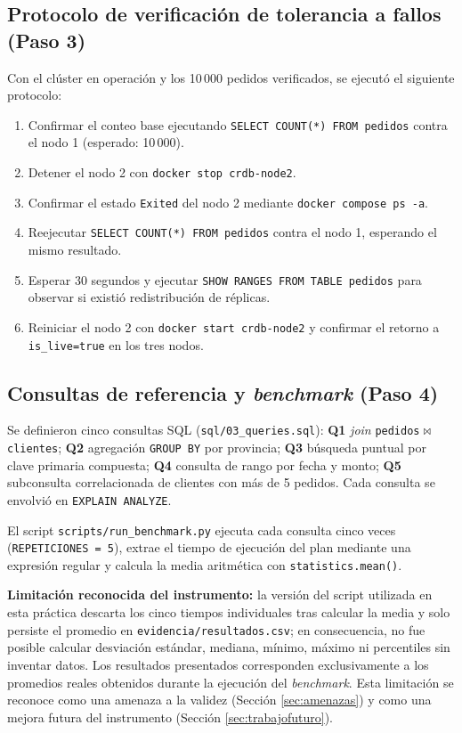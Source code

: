 \documentclass[10pt,letterpaper]{article}
\begin{document}
\subsection{Protocolo de verificación de tolerancia a fallos (Paso 3)}
Con el clúster en operación y los 10\,000 pedidos verificados, se ejecutó el siguiente protocolo:
\begin{enumerate}[leftmargin=*]
\item Confirmar el conteo base ejecutando \texttt{SELECT COUNT(*) FROM pedidos} contra el nodo 1 (esperado: 10\,000).
\item Detener el nodo 2 con \texttt{docker stop crdb-node2}.
\item Confirmar el estado \texttt{Exited} del nodo 2 mediante \texttt{docker compose ps -a}.
\item Reejecutar \texttt{SELECT COUNT(*) FROM pedidos} contra el nodo 1, esperando el mismo resultado.
\item Esperar 30 segundos y ejecutar \texttt{SHOW RANGES FROM TABLE pedidos} para observar si existió redistribución de réplicas.
\item Reiniciar el nodo 2 con \texttt{docker start crdb-node2} y confirmar el retorno a \texttt{is\_live=true} en los tres nodos.
\end{enumerate}

\subsection{Consultas de referencia y \textit{benchmark} (Paso 4)}
Se definieron cinco consultas SQL (\texttt{sql/03\_queries.sql}): \textbf{Q1} \textit{join} \texttt{pedidos}$\Join$\texttt{clientes}; \textbf{Q2} agregación \texttt{GROUP BY} por provincia; \textbf{Q3} búsqueda puntual por clave primaria compuesta; \textbf{Q4} consulta de rango por fecha y monto; \textbf{Q5} subconsulta correlacionada de clientes con más de 5 pedidos. Cada consulta se envolvió en \texttt{EXPLAIN ANALYZE}.

El script \texttt{scripts/run\_benchmark.py} ejecuta cada consulta cinco veces (\texttt{REPETICIONES = 5}), extrae el tiempo de ejecución del plan mediante una expresión regular y calcula la media aritmética con \texttt{statistics.mean()}.

\textbf{Limitación reconocida del instrumento:} la versión del script utilizada en esta práctica descarta los cinco tiempos individuales tras calcular la media y solo persiste el promedio en \texttt{evidencia/resultados.csv}; en consecuencia, no fue posible calcular desviación estándar, mediana, mínimo, máximo ni percentiles sin inventar datos. Los resultados presentados corresponden exclusivamente a los promedios reales obtenidos durante la ejecución del \textit{benchmark}. Esta limitación se reconoce como una amenaza a la validez (Sección \ref{sec:amenazas}) y como una mejora futura del instrumento (Sección \ref{sec:trabajofuturo}).
\end{document}
